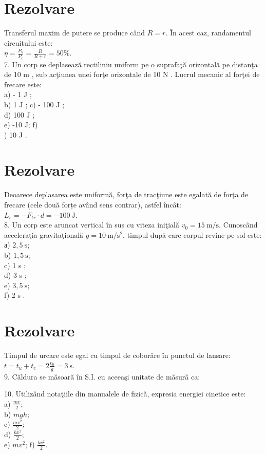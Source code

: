 \section*{Rezolvare}
Transferul maxim de putere se produce când $R=r$. În acest caz, randamentul circuitului este:\\
$\eta=\frac{P_{u}}{P_{c}}=\frac{R}{R+r}=50 \%$.\\
7. Un corp se deplasează rectiliniu uniform pe o suprafaţă orizontală pe distanţa de 10 m , sub acţiunea unei forţe orizontale de 10 N . Lucrul mecanic al forţei de frecare este:\\
a) - 1 J ;\\
b) 1 J ; c) - 100 J ;\\
d) 100 J ;\\
e) -10 J; f)\\
) 10 J .

\section*{Rezolvare}
Deoarece deplasarea este uniformă, forţa de tracţiune este egalată de forţa de frecare (cele două forțe având sens contrar), astfel încât:\\
$L_{r}=-F_{t r} \cdot d=-100 \mathrm{~J}$.\\
8. Un corp este aruncat vertical în sus cu viteza iniţială $v_{0}=15 \mathrm{~m} / \mathrm{s}$. Cunoscând acceleraţia gravitaţională $g=10 \mathrm{~m} / \mathrm{s}^{2}$, timpul după care corpul revine pe sol este:\\
а) $2,5 \mathrm{~s}$;\\
b) $1,5 \mathrm{~s}$;\\
c) 1 s ;\\
d) 3 s ;\\
e) $3,5 \mathrm{~s}$;\\
f) 2 s .

\section*{Rezolvare}
Timpul de urcare este egal cu timpul de coborâre în punctul de lansare: $t=t_{u}+t_{c}=2 \frac{v_{0}}{g}=3 \mathrm{~s}$.\\
9. Căldura se măsoară în S.I. cu aceeaşi unitate de măsură ca:

10. Utilizând notaţiile din manualele de fizică, expresia energiei cinetice este:\\
a) $\frac{m v}{2}$;\\
b) $m g h$;\\
c) $\frac{m v^{2}}{2}$;\\
d) $\frac{k x^{2}}{2}$;\\
e) $m v^{2}$; f) $\frac{k v^{2}}{2}$.

